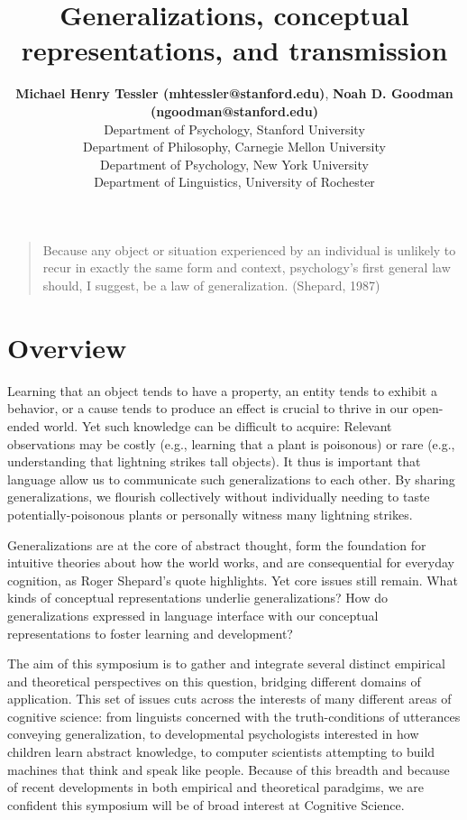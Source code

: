 \documentclass[10pt,letterpaper]{article}
\title{Generalizations, conceptual representations, and transmission}
\author{{\large \bf Michael Henry Tessler (mhtessler@stanford.edu)}, {\large \bf Noah D. Goodman (ngoodman@stanford.edu)}  \\
  Department of Psychology, Stanford University
   \AND {\large \bf David Danks (ddanks@cmu.edu)} \\
  Department of Philosophy, Carnegie Mellon University
    \AND {\large \bf Marjorie Rhodes (marjorie.rhodes@nyu.edu)} \\
  Department of Psychology, New York University
    \AND {\large \bf Gregory Carlson (calrson@ling.rochester.edu)} \\
  Department of Linguistics, University of Rochester
  }
\begin{document}
\maketitle



\begin{quote}
Because any object or situation experienced by an individual is unlikely to recur in exactly the same form and context, psychology's first general law should, I suggest, be a law of generalization.  (Shepard, 1987)
\end{quote}

\section{Overview}

Learning that an object tends to have a property, an entity tends to exhibit a behavior, or a cause tends to produce an effect is crucial to thrive in our open-ended world. 
Yet such knowledge can be difficult to acquire: Relevant observations may be costly (e.g., learning that a plant is poisonous) or rare (e.g., understanding that lightning strikes tall objects). 
It thus is important that language allow us to communicate such generalizations to each other. 
By sharing generalizations, we flourish collectively without individually needing to taste potentially-poisonous plants or personally witness many lightning strikes.

Generalizations are at the core of abstract thought, form the foundation for intuitive theories about how the world works, and are consequential for everyday cognition, as Roger Shepard's quote highlights.
Yet core issues still remain. 
What kinds of conceptual representations underlie generalizations?
How do generalizations expressed in language interface with our conceptual representations to foster learning and development?

The aim of this symposium is to gather and integrate several distinct empirical and theoretical perspectives on this question, bridging different domains of application.
This set of issues cuts across the interests of many different areas of cognitive science: from linguists concerned with the truth-conditions of utterances conveying generalization, to developmental psychologists interested in how children learn abstract knowledge, to computer scientists attempting to build machines that think and speak like people. 
Because of this breadth and because of recent developments in both empirical and theoretical paradgims, we are confident this symposium will be of broad interest at Cognitive Science.
\end{document}
